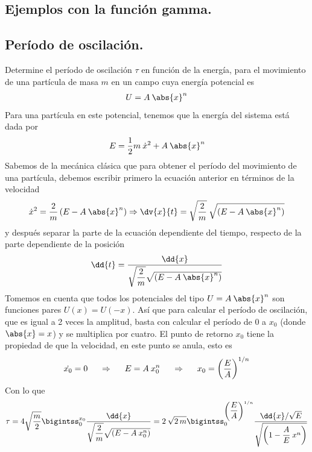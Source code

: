 \subsection{Ejemplos con la función gamma.}
\subsection*{Período de oscilación.}
Determine el período de oscilación $\tau$ en función de la energía, para el movimiento de una partícula de masa $m$ en un campo cuya energía potencial es
\begin{align*}
U = A \: \abs{x}^{n}
\end{align*}
Para una partícula en este potencial, tenemos que la energía del sistema está dada por
\begin{align*}
E = \dfrac{1}{2} m \: \dot{x}^{2} + A \: \abs{x}^{n}
\end{align*}
Sabemos de la mecánica clásica que para obtener el período del movimiento de una partícula, debemos escribir primero la ecuación anterior en términos de la velocidad
\begin{align*}
\dot{x}^{2} = \dfrac{2}{m} \left( E - A \: \abs{x}^{n} \right) \Rightarrow \dv{x}{t} =  \sqrt{\dfrac{2}{m}} \: \sqrt{\left( E - A \: \abs{x}^{n} \right)}
\end{align*}
y después separar la parte de la ecuación dependiente del tiempo, respecto de la parte dependiente de la posición
\begin{align*}
\dd{t} = \dfrac{\dd{x}}{\sqrt{\dfrac{2}{m}} \sqrt{\left( E - A \: \abs{x}^{n} \right)}}
\end{align*}
Tomemos en cuenta que todos los potenciales del tipo $U = A \: \abs{x}^{n}$ son funciones pares $U(x) =  U(-x)$. Así que para calcular el período de oscilación, que es igual a 2 veces la amplitud, basta con calcular el período de $0$ a $x_{0}$ (donde $\abs{x} = x$) y se multiplica por cuatro. El punto de retorno $x_{0}$ tiene la propiedad de que la velocidad, en este punto se anula, esto es
\begin{align*}
\dot{x_{0}} = 0 \hspace{0.5cm} \Rightarrow \hspace{0.5cm} E = A \: x_{0}^{n} \hspace{0.5cm} \Rightarrow \hspace{0.5cm} x_{0} = \left( \dfrac{E}{A} \right)^{1/n}
\end{align*}
Con lo que
\begin{align*}
\tau =  4 \sqrt{\dfrac{m}{2}} \bigintss_{0}^{x_{0}} \dfrac{\dd{x}}{\sqrt{\dfrac{2}{m}} \sqrt{\left( E - A \: x_{0}^{n} \right)}} = 2 \: \sqrt{2 \, m} \bigintss_{0}^{\left( \dfrac{E}{A} \right)^{1/n}} \dfrac{\dd{x} / \sqrt{E}}{\sqrt{ \left( 1 - \dfrac{A}{E} \: x^{n} \right) }}
\end{align*}
